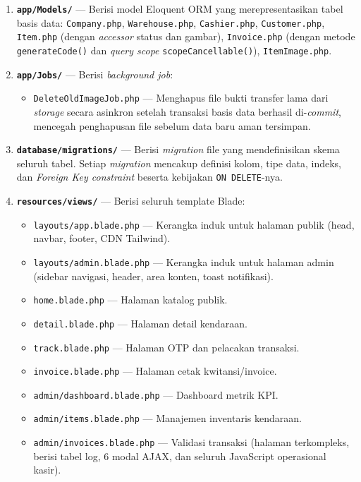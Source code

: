 \documentclass[11pt, a5paper]{article}
\begin{document}
\begin{enumerate}[label=\arabic*.]
  \item \textbf{\texttt{app/Models/}} --- Berisi model Eloquent ORM yang
        merepresentasikan tabel basis data:
        \texttt{Company.php}, \texttt{Warehouse.php}, \texttt{Cashier.php},
        \texttt{Customer.php}, \texttt{Item.php} (dengan \textit{accessor}
        status dan gambar), \texttt{Invoice.php} (dengan metode
        \texttt{generateCode()} dan \textit{query scope}
        \texttt{scopeCancellable()}), \texttt{ItemImage.php}.

  \item \textbf{\texttt{app/Jobs/}} --- Berisi \textit{background job}:
    \begin{itemize}
      \item \texttt{DeleteOldImageJob.php} --- Menghapus file bukti transfer
            lama dari \textit{storage} secara asinkron setelah transaksi basis
            data berhasil di-\textit{commit}, mencegah penghapusan file sebelum
            data baru aman tersimpan.
    \end{itemize}

  \item \textbf{\texttt{database/migrations/}} --- Berisi \textit{migration}
        file yang mendefinisikan skema seluruh tabel. Setiap \textit{migration}
        mencakup definisi kolom, tipe data, indeks, dan \textit{Foreign Key
        constraint} beserta kebijakan \texttt{ON DELETE}-nya.

  \item \textbf{\texttt{resources/views/}} --- Berisi seluruh template Blade:
    \begin{itemize}
      \item \texttt{layouts/app.blade.php} --- Kerangka induk untuk halaman
            publik (head, navbar, footer, CDN Tailwind).
      \item \texttt{layouts/admin.blade.php} --- Kerangka induk untuk halaman
            admin (sidebar navigasi, header, area konten, toast notifikasi).
      \item \texttt{home.blade.php} --- Halaman katalog publik.
      \item \texttt{detail.blade.php} --- Halaman detail kendaraan.
      \item \texttt{track.blade.php} --- Halaman OTP dan pelacakan transaksi.
      \item \texttt{invoice.blade.php} --- Halaman cetak kwitansi/invoice.
      \item \texttt{admin/dashboard.blade.php} --- Dashboard metrik KPI.
      \item \texttt{admin/items.blade.php} --- Manajemen inventaris kendaraan.
      \item \texttt{admin/invoices.blade.php} --- Validasi transaksi (halaman
            terkompleks, berisi tabel log, 6 modal AJAX, dan seluruh JavaScript
            operasional kasir).
    \end{itemize}


\end{enumerate}
\end{document}
